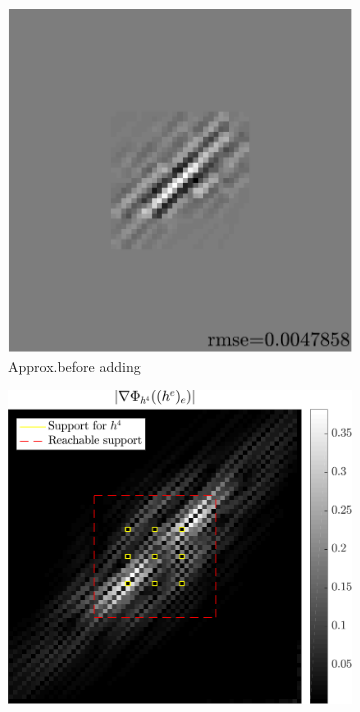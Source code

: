 \begin{figure}[!ht]
\begin{subfigure}[b]{0.28\linewidth}\centering
\includegraphics[width=\linewidth]{figures/before_after/before_approx.pdf}
\caption{Approx.\@ before adding}\label{fig_beforeafter-before-approx}
\end{subfigure}
\begin{subfigure}[b]{0.34\linewidth}\centering
\includegraphics[width=\linewidth]{figures/before_after/before_partgrad4.pdf}

\end{subfigure}
\end{figure}

